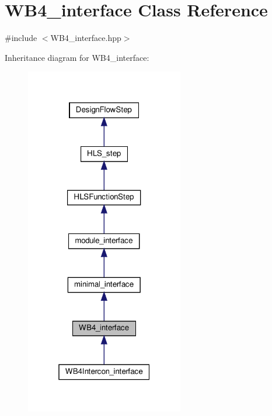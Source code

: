 \hypertarget{classWB4__interface}{}\section{W\+B4\+\_\+interface Class Reference}
\label{classWB4__interface}


{\ttfamily \#include $<$W\+B4\+\_\+interface.\+hpp$>$}



Inheritance diagram for W\+B4\+\_\+interface\+:
\nopagebreak
\begin{figure}[H]
\begin{center}
\leavevmode
\includegraphics[width=196pt]{da/d3a/classWB4__interface__inherit__graph}
\end{center}
\end{figure}


